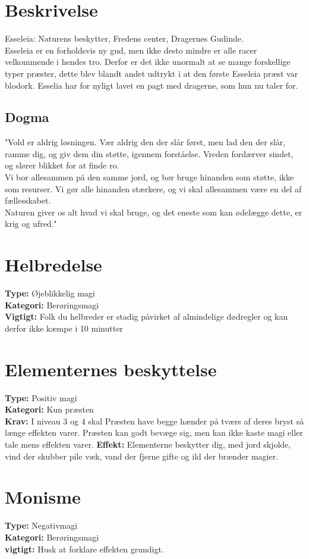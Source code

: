 \section{Beskrivelse}
Esseleia: Naturens beskytter, Fredens center, Dragernes Gudinde.\\ Esseleia er en forholdsvis ny gud, men ikke desto mindre er alle racer velkommende i hendes tro. Derfor er det ikke unormalt at se mange forskellige typer præster, dette blev blandt andet udtrykt i at den første Esseleia præst var blodork. Esselia har for nyligt lavet en pagt med dragerne, som hun nu taler for.
\subsection{Dogma}
"Vold er aldrig løsningen. Vær aldrig den der slår først, men lad den der slår, ramme dig, og giv dem din støtte, igennem forståelse. Vreden fordærver sindet, og slører blikket for at finde ro. \\
Vi bor allesammen på den samme jord, og bør bruge hinanden som støtte, ikke som resurser. Vi gør alle hinanden stærkere, og vi skal allesammen være en del af fællesskabet.\\
Naturen giver os alt hvad vi skal bruge, og det eneste som kan ødelægge dette, er krig og ufred."

\section{Helbredelse}
\textbf{Type:} Øjeblikkelig magi \\
\textbf{Kategori:} Berøringsmagi\\
\textbf{Vigtigt:} Folk du helbreder er stadig påvirket af almindelige dødregler og kan derfor ikke kæmpe i 10 minutter

\section{Elementernes beskyttelse}
\textbf{Type:} Positiv magi\\
\textbf{Kategori:} Kun præsten\\
\textbf{Krav:} I niveau 3 og 4 skal Præsten have begge hænder på tværs af deres bryst så længe effekten varer. Præsten kan godt bevæge sig, men kan ikke kaste magi eller tale mens effekten varer.
\textbf{Effekt:} Elementerne beskytter dig, med jord skjolde, vind der skubber pile væk, vand der fjerne gifte og ild der brænder magier.

\section{Monisme}
\textbf{Type:} Negativmagi\\
\textbf{Kategori:} Berøringsmagi\\
\textbf{vigtigt:} Husk at forklare effekten grundigt.


